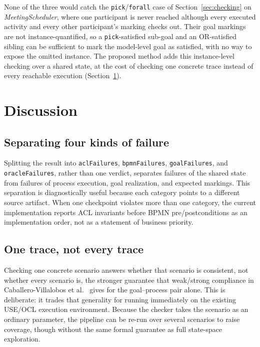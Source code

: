 \documentclass[a4paper, conference]{IEEEtran}
\begin{document}
None of the three would catch the \texttt{pick}/\texttt{forall} case of Section~\ref{sec:checking} on \textit{MeetingScheduler}, where one participant is never reached although every executed activity and every other participant's marking checks out. Their goal markings are not instance-quantified, so a \texttt{pick}-satisfied sub-goal and an OR-satisfied sibling can be sufficient to mark the model-level goal as satisfied, with no way to expose the omitted instance. The proposed method adds this instance-level checking over a shared state, at the cost of checking one concrete trace instead of every reachable execution (Section~\ref{sect:discussion}).

\section{Discussion}
\label{sect:discussion}

\subsection{Separating four kinds of failure}
Splitting the result into \texttt{aclFailures}, \texttt{bpmnFailures}, \texttt{goalFailures}, and \texttt{oracleFailures}, rather than one verdict, separates failures of the shared state from failures of process execution, goal realization, and expected markings. This separation is diagnostically useful because each category points to a different source artifact. When one checkpoint violates more than one category, the current implementation reports ACL invariants before BPMN pre/postconditions as an implementation order, not as a statement of business priority.

\subsection{One trace, not every trace}
Checking one concrete scenario answers whether that scenario is consistent, not whether every scenario is, the stronger guarantee that weak/strong compliance in Caballero-Villalobos et al.~\cite{caballero2026alig} gives for the goal--process pair alone. This is deliberate: it trades that generality for running immediately on the existing USE/OCL execution environment. Because the checker takes the scenario as an ordinary parameter, the pipeline can be re-run over several scenarios to raise coverage, though without the same formal guarantee as full state-space exploration.
\end{document}
